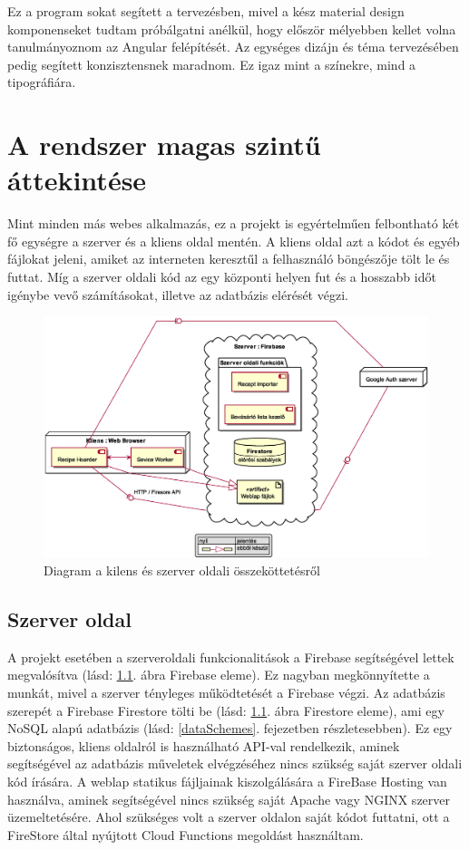 \documentclass[12pt]{report}
\theoremstyle{definition}
\begin{document}
Ez a program sokat segített a tervezésben, mivel a kész material design komponenseket tudtam próbálgatni anélkül, hogy először mélyebben kellet volna tanulmányoznom az Angular felépítését. 
Az egységes dizájn és téma tervezésében pedig segített konzisztensnek maradnom. Ez igaz mint a színekre, mind a tipográfiára.


\chapter{A rendszer magas szintű áttekintése}
\label{systemExplanation}
Mint minden más webes alkalmazás, ez a projekt is egyértelműen felbontható két fő egységre a szerver és a kliens oldal mentén. 
A kliens oldal azt a kódot és egyéb fájlokat jeleni, amiket az interneten keresztűl a felhasználó böngészője tölt le és futtat. 
Míg a szerver oldali kód az egy központi helyen fut és a hosszabb időt igénybe vevő számításokat, illetve az adatbázis elérését végzi.

\noindent
\begin{figure}[H]
	\centering
	\includegraphics[width=\textwidth]{out/diagrams/deployment/deployment.eps}
	\caption{Diagram a kilens és szerver oldali összeköttetésről}
    \label{fig:deployment}
\end{figure}

\section{Szerver oldal}
A projekt esetében a szerveroldali funkcionalitások a Firebase segítségével lettek megvalósítva (lásd: \ref{fig:deployment}. ábra Firebase eleme). 
Ez nagyban megkönnyítette a munkát, mivel a szerver tényleges működtetését a Firebase végzi. 
Az adatbázis szerepét a Firebase Firestore tölti be (lásd: \ref{fig:deployment}.  ábra Firestore eleme), ami egy NoSQL alapú adatbázis (lásd: \ref{dataSchemes}. fejezetben részletesebben).  Ez egy biztonságos, kliens oldalról is használható API-val rendelkezik, aminek segítségével az adatbázis műveletek elvégzéséhez nincs szükség saját szerver oldali kód írására. A weblap statikus fájljainak kiszolgálására a FireBase Hosting van használva, aminek segítségével nincs szükség saját \Gls{Apache} vagy \Gls{NGINX} szerver üzemeltetésére. Ahol szükséges volt a szerver oldalon saját kódot futtatni, ott a FireStore által nyújtott Cloud Functions megoldást használtam.
\end{document}
